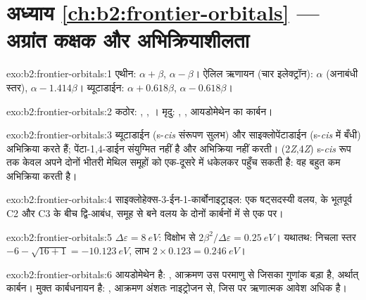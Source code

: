 \section*{अध्याय \ref{ch:b2:frontier-orbitals} --- अग्रांत कक्षक और अभिक्रियाशीलता}

\begin{solution}{exo:b2:frontier-orbitals:1}
एथीन:  $\alpha + \beta$,  $\alpha - \beta$। ऐलिल ऋणायन (चार इलेक्ट्रॉन):  $\alpha$ (अनाबंधी
स्तर),  $\alpha - 1.414\beta$। ब्यूटाडाईन:  $\alpha + 0.618\beta$,  $\alpha -
0.618\beta$।
\end{solution}

\begin{solution}{exo:b2:frontier-orbitals:2}
कठोर: , , । मृदु: , , आयडोमेथेन का कार्बन।
\end{solution}

\begin{solution}{exo:b2:frontier-orbitals:3}
ब्यूटाडाईन (s-\textit{cis} संरूपण सुलभ) और साइक्लोपेंटाडाईन (s-\textit{cis} में बँधी) अभिक्रिया करते हैं;
पेंटा-1,4-डाईन संयुग्मित नहीं है और अभिक्रिया नहीं करती। (2\textit{Z},4\textit{Z}) 
s-\textit{cis} रूप तक केवल अपने दोनों भीतरी मेथिल समूहों को एक-दूसरे में धकेलकर पहुँच सकती है:
वह बहुत कम अभिक्रिया करती है।
\end{solution}

\begin{solution}{exo:b2:frontier-orbitals:4}
साइक्लोहेक्स-3-ईन-1-कार्बोनाइट्राइल: एक षट्सदस्यी वलय,  के भूतपूर्व C2
और C3 के बीच द्वि-आबंध,  समूह  से बने वलय के दोनों
कार्बनों में से एक पर।
\end{solution}

\begin{solution}{exo:b2:frontier-orbitals:5}
$\Delta\varepsilon = \qty{8}{eV}$: विक्षोभ से $2\beta^2/\Delta\varepsilon = \qty{0.25}{eV}$। यथातथ: निचला स्तर
$-6 - \sqrt{16 + 1} = \qty{-10.123}{eV}$, लाभ $2 \times 0.123 = \qty{0.246}{eV}$।
\end{solution}

\begin{solution}{exo:b2:frontier-orbitals:6}
आयडोमेथेन  है: , आक्रमण उस परमाणु से जिसका
 गुणांक बड़ा है, अर्थात् कार्बन। मुक्त कार्बधनायन  है: ,
आक्रमण अंशतः नाइट्रोजन से, जिस पर ऋणात्मक आवेश अधिक है।
\end{solution}

